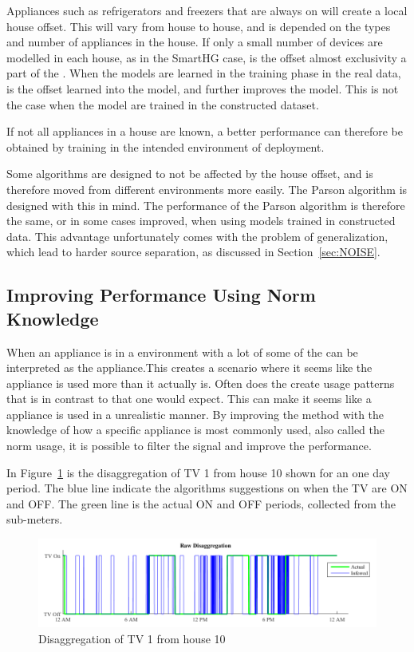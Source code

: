 Appliances such as refrigerators and freezers that are always on will create a local house offset. This will vary from house to house, and is depended on the types and number of appliances in the house. If only a small number of devices are modelled in each house, as in the SmartHG case, is the offset almost exclusivity a part of the . When the models are learned in the training phase in the real data, is the offset learned into the model, and further improves the model. This is not the case when the model are trained in the constructed dataset. 

If not all appliances in a house are known, a better performance can therefore be obtained by training in the intended environment of deployment. 

Some algorithms are designed to not be affected by the house offset, and is therefore moved from different environments more easily. The Parson algorithm is designed with this in mind. The performance of the Parson algorithm is therefore the same, or in some cases improved, when using models trained in constructed data. This advantage unfortunately comes with the problem of generalization, which lead to harder source separation, as discussed in Section~\ref{sec:NOISE}. 

\subsection{Improving Performance Using Norm Knowledge }
\label{sec:NormFilter}
When an appliance is in a environment with a lot of  some of the  can be interpreted as the appliance.This  creates a scenario where it seems like the appliance is used more than it actually is. Often does the  create usage patterns that is in contrast to that one would expect. This can make it seems like a appliance is used in a unrealistic manner. By improving the method with the knowledge of how a specific appliance is most commonly used, also called the norm usage, it is possible to filter the signal and improve the performance. 

In Figure~\ref{fig:Norm1} is the disaggregation of TV 1 from house 10 shown for an one day period. The blue line indicate the  algorithms suggestions on when the TV are ON and OFF. The green line is the actual ON and OFF periods, collected from the sub-meters. 

\begin{figure}[H]
\centering
\includegraphics[width=1\textwidth]{billeder/AppNormFilterH10_1.png}
\caption{Disaggregation of TV 1 from house 10}
\label{fig:Norm1}
\end{figure}

